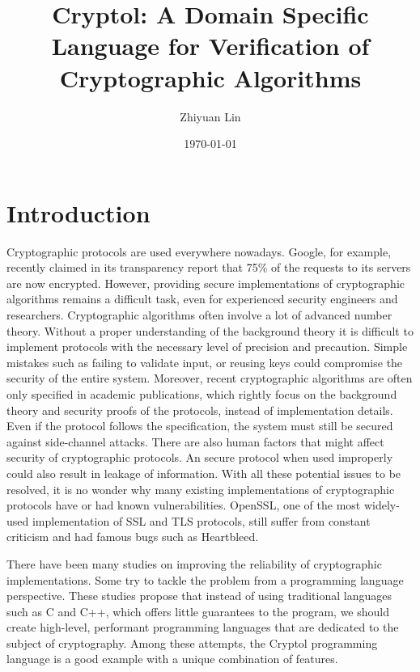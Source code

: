 \documentclass[a4paper, notitlepage]{report}
\title{Cryptol: A Domain Specific Language for  Verification of Cryptographic Algorithms}
\author{Zhiyuan Lin}
\date{\today}
\begin{document}
\maketitle
\begin{abstract}

\end{abstract}

\newpage

\tableofcontents

\newpage


\chapter{Introduction}

Cryptographic protocols are used everywhere nowadays. Google, for example,
recently claimed in its transparency report that 75\% of the requests to
its servers are now encrypted.
However, providing secure implementations of cryptographic algorithms
remains a difficult task, even for experienced security engineers and
researchers.
Cryptographic algorithms often involve a lot of advanced number theory.
Without a proper understanding of the background theory it is difficult to implement
protocols with the necessary level of precision and precaution.
Simple mistakes such as failing to validate input, or reusing keys could
compromise the security of the entire system.
Moreover, recent cryptographic algorithms are often only specified in
academic publications, which rightly focus on the background theory and security
proofs of the protocols, instead of implementation details.
Even if the protocol follows the specification, the system must still be secured
against side-channel attacks.
There are also human factors that might affect security of cryptographic protocols.
An secure protocol when used improperly could also result in leakage of information.
With all these potential issues to be resolved, it is no wonder why
many existing implementations of cryptographic protocols have or had known
vulnerabilities.
OpenSSL, one of the most widely-used implementation of SSL and
TLS protocols, still suffer from constant criticism and had famous bugs such as
Heartbleed.

There have been many studies on improving the reliability of cryptographic
implementations. Some try to tackle the problem from a programming language
perspective.
These studies propose that instead of using traditional languages such as
C and C++, which offers little guarantees to the program, we should create high-level,
performant programming languages
that are dedicated to the subject of cryptography.
Among these attempts, the Cryptol programming language is a good example with
a unique combination of features. 
\end{document}

